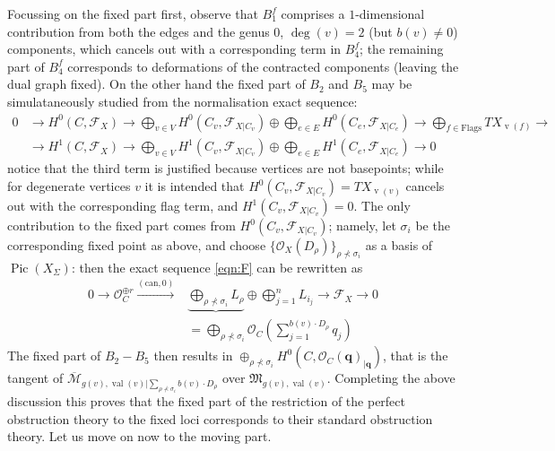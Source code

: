\documentclass[11pt]{amsart}
\newcommand{\OO}{\mathcal{O}}
\renewcommand{\to}{\rightarrow}
\newcommand{\F}{\mathcal F}
\newcommand{\Pic}{\operatorname{Pic}}
\newcommand{\val}{\operatorname{val}}
\newcommand{\vv}{\operatorname{v}}
\theoremstyle{definition}
\theoremstyle{definition}
\begin{document}
Focussing on the fixed part first, observe that $B_1^f$ comprises a $1$-dimensional contribution from both the edges and the genus $0$, $\deg(v)=2$ (but $b(v)\neq 0$) components, which cancels out with a corresponding term in $B_4^f$; the remaining part of $B_4^f$ corresponds to deformations of the contracted components (leaving the dual graph fixed). On the other hand the fixed part of $B_2$ and $B_5$ may be simulataneously studied from the normalisation exact sequence:
\begin{equation}\label{eqn:normalisation}
\begin{aligned}
 0&\to H^0(C,\F_X)\to \bigoplus_{v\in V}H^0(C_v,\F_{X|C_v})\oplus \bigoplus_{e\in E}H^0(C_e,\F_{X|C_e})\to \bigoplus_{f\in\text{Flags}} TX_{\vv(f)}\to \\
 &\to H^1(C,\F_X)\to \bigoplus_{v\in V}H^1(C_v,\F_{X|C_v})\oplus \bigoplus_{e\in E}H^1(C_e,\F_{X|C_e})\to 0
\end{aligned} 
\end{equation}
notice that the third term is justified because vertices are not basepoints; while for degenerate vertices $v$ it is intended that $H^0(C_v,\F_{X|C_v})=TX_{\vv(v)}$ cancels out with the corresponding flag term, and $H^1(C_v,\F_{X|C_v})=0$. The only contribution to the fixed part comes from $H^0(C_v,\F_{X|C_v})$; namely, let $\sigma_i$ be the corresponding fixed point as above, and choose $\{\OO_X(D_\rho)\}_{\rho\nprec\sigma_i}$ as a basis of $\Pic(X_\Sigma)$: then the exact sequence \eqref{eqn:F} can be rewritten as
\begin{equation}\label{eqn:Fbasis}
 \begin{aligned}
 0\to\OO_C^{\oplus r}\xrightarrow{\left(\text{can},0\right)} & \underbrace{\bigoplus_{\rho\nprec\sigma_i} L_\rho}\oplus\bigoplus_{j=1}^n L_{i_j}\to\F_X\to 0 \\
 & = \bigoplus_{\rho\nprec\sigma_i}\OO_C(\sum_{j=1}^{b(v)\cdot D_\rho}q_j)
\end{aligned}
\end{equation}
The fixed part of $B_2-B_5$ then results in $\oplus_{\rho\nprec\sigma_i}H^0(C,\OO_C(\mathbf q)_{|\mathbf q})$, that is the tangent of $\overline{\mathcal M}_{g(v),\val(v)|\sum_{\rho\nprec\sigma_i}b(v)\cdot D_\rho}$ over $\mathfrak M_{g(v),\val(v)}$. Completing the above discussion this proves that the fixed part of the restriction of the perfect obstruction theory to the fixed loci corresponds to their standard obstruction theory. Let us move on now to the moving part.
\end{document}
